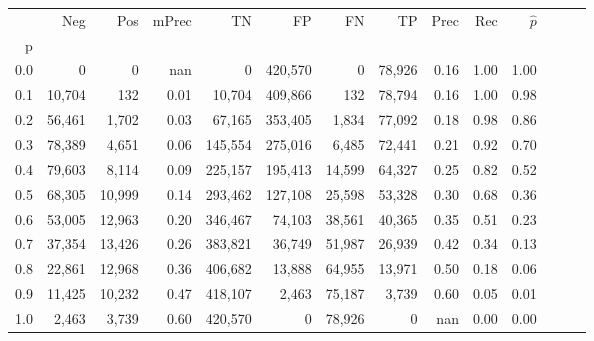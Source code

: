 \begin{tabular}{rrrrrrrrrrrrrr}
\toprule
{} &     Neg &     Pos & mPrec &       TN &       FP &      FN &      TP &  Prec &   Rec & $\hat{p}$ \\
p   &         &         &       &          &          &         &         &       &       &           \\
\midrule
0.0 &       0 &       0 &   nan &        0 &  420,570 &       0 &  78,926 &  0.16 &  1.00 &      1.00 \\
0.1 &  10,704 &     132 &  0.01 &   10,704 &  409,866 &     132 &  78,794 &  0.16 &  1.00 &      0.98 \\
0.2 &  56,461 &   1,702 &  0.03 &   67,165 &  353,405 &   1,834 &  77,092 &  0.18 &  0.98 &      0.86 \\
0.3 &  78,389 &   4,651 &  0.06 &  145,554 &  275,016 &   6,485 &  72,441 &  0.21 &  0.92 &      0.70 \\
0.4 &  79,603 &   8,114 &  0.09 &  225,157 &  195,413 &  14,599 &  64,327 &  0.25 &  0.82 &      0.52 \\
0.5 &  68,305 &  10,999 &  0.14 &  293,462 &  127,108 &  25,598 &  53,328 &  0.30 &  0.68 &      0.36 \\
0.6 &  53,005 &  12,963 &  0.20 &  346,467 &   74,103 &  38,561 &  40,365 &  0.35 &  0.51 &      0.23 \\
0.7 &  37,354 &  13,426 &  0.26 &  383,821 &   36,749 &  51,987 &  26,939 &  0.42 &  0.34 &      0.13 \\
0.8 &  22,861 &  12,968 &  0.36 &  406,682 &   13,888 &  64,955 &  13,971 &  0.50 &  0.18 &      0.06 \\
0.9 &  11,425 &  10,232 &  0.47 &  418,107 &    2,463 &  75,187 &   3,739 &  0.60 &  0.05 &      0.01 \\
1.0 &   2,463 &   3,739 &  0.60 &  420,570 &        0 &  78,926 &       0 &   nan &  0.00 &      0.00 \\
\bottomrule
\end{tabular}
